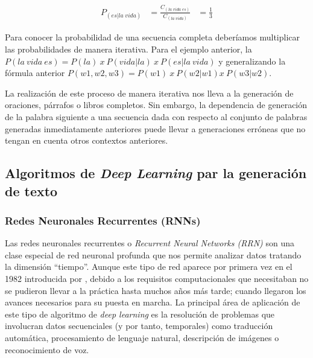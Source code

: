 \begin{equation}
	\label{eq:probabilidadesngram_ejemplo}
	\begin{aligned}
		P_{(es|la\;vida)} & = \frac{C_{(la\;vida\;es)}}{C_{(la\;vida)}}  &= \frac{1}{3}
	\end{aligned}
\end{equation}

Para conocer la probabilidad de una secuencia completa deberíamos multiplicar las probabilidades de manera iterativa. Para el ejemplo anterior, la $P(la\:vida\:es)= P(la)\:x\:P(vida|la)\:x\:P(es|la\:vida)$ y generalizando la fórmula anterior  $P(w1, w2, w3)= P(w1)\:x\:P(w2|w1)x\:P(w3|w2)$.

La realización de este proceso de manera iterativa nos lleva a la generación de oraciones, párrafos o libros completos. Sin embargo, la dependencia de generación de la palabra siguiente a una secuencia dada con respecto al conjunto de palabras generadas inmediatamente anteriores puede llevar a generaciones erróneas que no tengan en cuenta otros contextos anteriores.

\subsection{Algoritmos de \textit{Deep Learning} par la generación de texto}
\subsubsection{Redes Neuronales Recurrentes (RNNs)}
\label{sec:rnn}
Las redes neuronales recurrentes o \textit{Recurrent Neural Networks (RRN)} son una clase especial de red neuronal profunda que nos permite analizar datos tratando la dimensión ``tiempo''.
Aunque este tipo de red aparece por primera vez en el 1982 introducida por \cite{firstrnn}, debido a los requisitos computacionales que necesitaban no se pudieron llevar a la práctica hasta muchos años más tarde; cuando llegaron los avances necesarios para su puesta en marcha. La principal área de aplicación de este tipo de algoritmo de \textit{deep learning} es la resolución de problemas que involucran datos secuenciales (y por tanto, temporales) como traducción automática, procesamiento de lenguaje natural, descripción de imágenes o reconocimiento de voz. 

